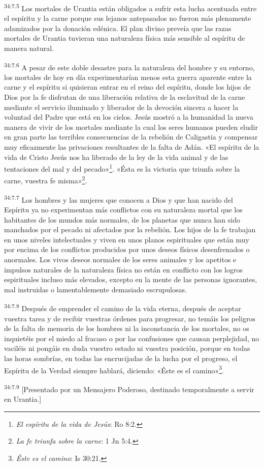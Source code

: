 \par
\textsuperscript{34:7.5} Los mortales de Urantia están obligados a sufrir esta lucha acentuada entre el espíritu y la carne porque sus lejanos antepasados no fueron más plenamente adamizados por la donación edénica. El plan divino preveía que las razas mortales de Urantia tuvieran una naturaleza física más sensible al espíritu de manera natural.

\par
\textsuperscript{34:7.6} A pesar de este doble desastre para la naturaleza del hombre y su entorno, los mortales de hoy en día experimentarían menos esta guerra aparente entre la carne y el espíritu si quisieran entrar en el reino del espíritu, donde los hijos de Dios por la fe disfrutan de una liberación relativa de la esclavitud de la carne mediante el servicio iluminado y liberador de la devoción sincera a hacer la voluntad del Padre que está en los cielos. Jesús mostró a la humanidad la nueva manera de vivir de los mortales mediante la cual los seres humanos pueden eludir en gran parte las terribles consecuencias de la rebelión de Caligastia y compensar muy eficazmente las privaciones resultantes de la falta de Adán. «El espíritu de la vida de Cristo Jesús nos ha liberado de la ley de la vida animal y de las tentaciones del mal y del pecado»\footnote{\textit{El espíritu de la vida de Jesús}: Ro 8:2.}. «Ésta es la victoria que triunfa sobre la carne, vuestra fe misma»\footnote{\textit{La fe triunfa sobre la carne}: 1 Jn 5:4.}.

\par
\textsuperscript{34:7.7} Los hombres y las mujeres que conocen a Dios y que han nacido del Espíritu ya no experimentan más conflictos con su naturaleza mortal que los habitantes de los mundos más normales, de los planetas que nunca han sido manchados por el pecado ni afectados por la rebelión. Los hijos de la fe trabajan en unos niveles intelectuales y viven en unos planos espirituales que están muy por encima de los conflictos producidos por unos deseos físicos desenfrenados o anormales. Los vivos deseos normales de los seres animales y los apetitos e impulsos naturales de la naturaleza física no están en conflicto con los logros espirituales incluso más elevados, excepto en la mente de las personas ignorantes, mal instruidas o lamentablemente demasiado escrupulosas.

\par
\textsuperscript{34:7.8} Después de emprender el camino de la vida eterna, después de aceptar vuestra tarea y de recibir vuestras órdenes para progresar, no temáis los peligros de la falta de memoria de los hombres ni la inconstancia de los mortales, no os inquietéis por el miedo al fracaso o por las confusiones que causan perplejidad, no vaciléis ni pongáis en duda vuestro estado ni vuestra posición, porque en todas las horas sombrías, en todas las encrucijadas de la lucha por el progreso, el Espíritu de la Verdad siempre hablará, diciendo: «Éste es el camino»\footnote{\textit{Éste es el camino}: Is 30:21.}.

\par
\textsuperscript{34:7.9} [Presentado por un Mensajero Poderoso, destinado temporalmente a servir en Urantia.]